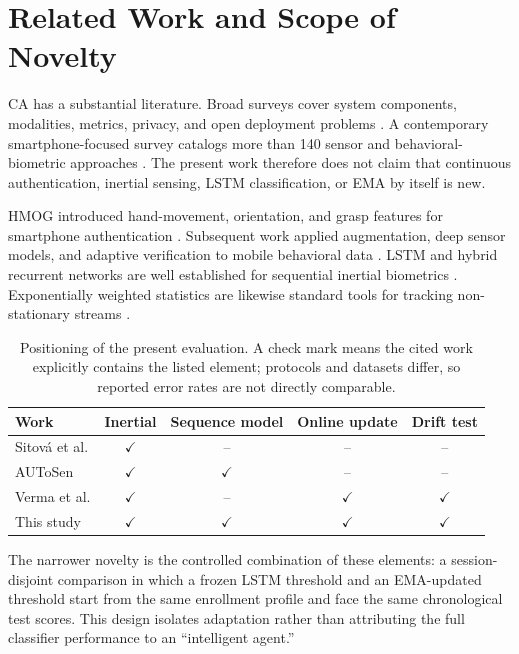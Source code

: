 \documentclass[3p,times,procedia]{elsarticle}
\begin{document}
\section{Related Work and Scope of Novelty}
\label{sec:related}

CA has a substantial literature. Broad surveys cover system components,
modalities, metrics, privacy, and open deployment problems
\cite{gonzalezmanzano_leveraging_2019,ayeswarya_survey_2019,
stylios_behavioral_2021}. A contemporary smartphone-focused survey catalogs
more than 140 sensor and behavioral-biometric approaches
\cite{abuhamad_sensorbased_2021}. The present work therefore does not claim that
continuous authentication, inertial sensing, LSTM classification, or EMA by
itself is new.

HMOG introduced hand-movement, orientation, and grasp features for smartphone
authentication \cite{sitova_hmog_2016}. Subsequent work applied augmentation,
deep sensor models, and adaptive verification to mobile behavioral data
\cite{li_using_2019,abuhamad_autosen_2020,verma_data-driven_2022}. LSTM and
hybrid recurrent networks are well established for sequential inertial
biometrics \cite{hochreiter_long_1997,zeng_gait-based_2021,giorgi_using_2021}.
Exponentially weighted statistics are likewise standard tools for tracking
non-stationary streams \cite{ross_exponentially_2012,gama_survey_2014}.

\begin{table}[H]
\centering
\small
\caption{Positioning of the present evaluation. A check mark means the cited
work explicitly contains the listed element; protocols and datasets differ, so
reported error rates are not directly comparable.}
\label{tab:position}
\begin{tabular}{lcccc}
\toprule
Work & Inertial & Sequence model & Online update & Drift test \\
\midrule
Sitov\'{a} et al. \cite{sitova_hmog_2016} & $\checkmark$ & -- & -- & -- \\
AUToSen \cite{abuhamad_autosen_2020} & $\checkmark$ & $\checkmark$ & -- & -- \\
Verma et al. \cite{verma_data-driven_2022} & $\checkmark$ & -- & $\checkmark$ & $\checkmark$ \\
This study & $\checkmark$ & $\checkmark$ & $\checkmark$ & $\checkmark$ \\
\bottomrule
\end{tabular}
\end{table}

The narrower novelty is the controlled combination of these elements: a
session-disjoint comparison in which a frozen LSTM threshold and an EMA-updated
threshold start from the same enrollment profile and face the same chronological
test scores. This design isolates adaptation rather than attributing the full
classifier performance to an ``intelligent agent.''
\end{document}
